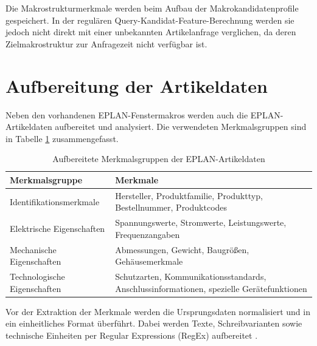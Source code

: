 Die Makrostrukturmerkmale werden beim Aufbau der Makrokandidatenprofile gespeichert. In der regulären Query-Kandidat-Feature-Berechnung werden sie jedoch nicht direkt mit einer unbekannten Artikelanfrage verglichen, da deren Zielmakrostruktur zur Anfragezeit nicht verfügbar ist.

\section{Aufbereitung der Artikeldaten}

Neben den vorhandenen EPLAN-Fenstermakros \cite{EPLAN-Makros} werden auch die EPLAN-Artikeldaten \cite{EPLANArtikelverwaltung} aufbereitet und analysiert. Die verwendeten Merkmalsgruppen sind in Tabelle \ref{tab:artikelmerkmale} zusammengefasst.

\begin{table}[htbp]
    \centering
    \setlength{\tabcolsep}{4pt}
    \renewcommand{\arraystretch}{1.08}
    \caption{Aufbereitete Merkmalsgruppen der EPLAN-Artikeldaten}
    \label{tab:artikelmerkmale}
    \begin{tabularx}{\textwidth}{>{\raggedright\arraybackslash}p{4.8cm} >{\raggedright\arraybackslash}X}
        \toprule
        \textbf{Merkmalsgruppe} & \textbf{Merkmale} \\
        \midrule
        Identifikationsmerkmale & Hersteller, Produktfamilie, Produkttyp, Bestellnummer, Produktcodes \\
        Elektrische Eigenschaften & Spannungswerte, Stromwerte, Leistungswerte, Frequenzangaben \\
        Mechanische Eigenschaften & Abmessungen, Gewicht, Baugrößen, Gehäusemerkmale \\
        Technologische Eigenschaften & Schutzarten, Kommunikationsstandards, Anschlussinformationen, spezielle Gerätefunktionen \\
        \bottomrule
    \end{tabularx}
\end{table}

Vor der Extraktion der Merkmale werden die Ursprungsdaten normalisiert und in ein einheitliches Format überführt. Dabei werden Texte, Schreibvarianten sowie technische Einheiten per Regular Expressions (RegEx) aufbereitet \cite{src_step911}.

